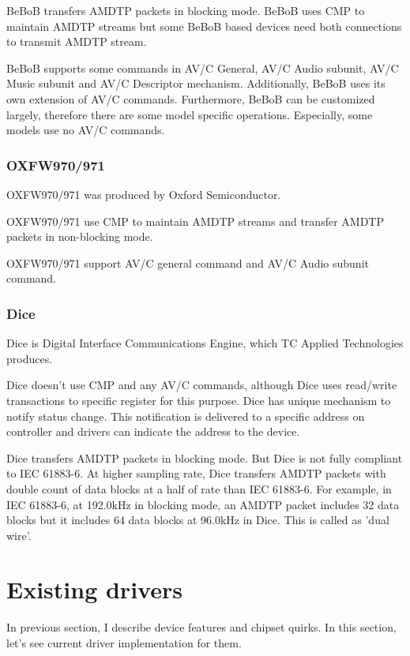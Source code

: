 \documentclass[onecolumn]{article}
\begin{document}
BeBoB transfers AMDTP packets in blocking mode. BeBoB uses CMP to maintain AMDTP streams but some BeBoB based devices need both connections to transmit AMDTP stream.

BeBoB supports some commands in AV/C General\cite{avc-general-4-2}, AV/C Audio subunit\cite{avc-audio-1}, AV/C Music subunit\cite{avc-music-1} and AV/C Descriptor mechanism\cite{avc-general-enhancement}. Additionally, BeBoB uses its own extension of AV/C commands\cite{bebob-1, bebob-2}. Furthermore, BeBoB can be customized largely, therefore there are some model specific operations. Especially, some models use no AV/C commands.


\subsubsection{OXFW970/971}
OXFW970/971 was produced by Oxford Semiconductor.

OXFW970/971 use CMP to maintain AMDTP streams and transfer AMDTP packets in non-blocking mode.

OXFW970/971 support AV/C general command\cite{avc-general-4-2} and AV/C Audio subunit command\cite{avc-audio-1}.

\subsubsection{Dice}
Dice is Digital Interface Communications Engine, which TC Applied Technologies produces.

Dice doesn't use CMP and any AV/C commands, although Dice uses read/write transactions to specific register for this purpose. Dice has unique mechanism to notify status change. This notification is delivered to a specific address on controller and drivers can indicate the address to the device.

Dice transfers AMDTP packets in blocking mode. But Dice is not fully compliant to IEC 61883-6. At higher sampling rate, Dice transfers AMDTP packets with double count of data blocks at a half of rate than IEC 61883-6. For example, in IEC 61883-6, at 192.0kHz in blocking mode, an AMDTP packet includes 32 data blocks but it includes 64 data blocks at 96.0kHz in Dice. This is called as 'dual wire'.


\section{Existing drivers}

In previous section, I describe device features and chipset quirks. In this section, let's see current driver implementation for them.
\end{document}
